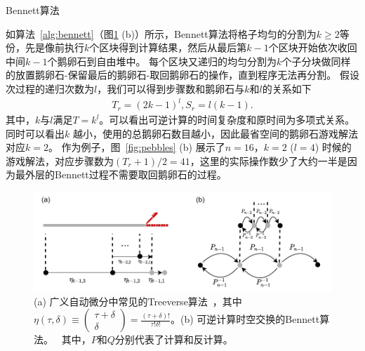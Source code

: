 \documentclass[A4,twoside,fontset=ubuntu,UTF8]{ctexart}
\begin{document}
\begin{algorithm}
    \SetAlgoLined
    \DontPrintSemicolon
    \caption{Bennett算法}\label{alg:bennett}
\end{algorithm}
如算法~\ref{alg:bennett}（图\ref{fig:tradeoff} (b)）所示，Bennett算法将格子均匀的分割为$k\geq 2$等份，先是像前执行$k$个区块得到计算结果，然后从最后第$k-1$个区块开始依次收回中间$k-1$个鹅卵石到自由堆中。
每个区块又递归的均匀分割为$k$个子分块做同样的放置鹅卵石-保留最后的鹅卵石-取回鹅卵石的操作，直到程序无法再分割。
假设次过程的递归次数为$l$，我们可以得到步骤数和鹅卵石与$k$和$l$的关系如下
\begin{align}\label{eq:rev}
    T_r = (2k-1)^l, S_r = l(k-1).
\end{align}
其中，$k$与$l$满足$T = k^l$。可以看出可逆计算的时间复杂度和原时间为多项式关系。
同时可以看出$k$ 越小，使用的总鹅卵石数目越小，因此最省空间的鹅卵石游戏解法对应$k=2$。
作为例子，图~\ref{fig:pebbles} (b) 展示了$n=16$，$k=2$ ($l=4$) 时候的游戏解法，对应步骤数为$(T_r+1)/2 = 41$，这里的实际操作数少了大约一半是因为最外层的Bennett过程不需要取回鹅卵石的过程。

\begin{figure}
    \centerline{\includegraphics[width=0.88\columnwidth,trim={0 0cm 0 0cm},clip]{tradeoff2.pdf}}
    \caption{(a) 广义自动微分中常见的Treeverse算法~\cite{Griewank1992}，其中$\eta(\tau, \delta) \equiv \left(\begin{matrix} \tau + \delta \\ \delta \end{matrix}\right)=\frac{(\tau+\delta)!}{\tau!\delta!}$。(b) 可逆计算时空交换的Bennett算法。~\cite{Bennett1973,Levine1990} 其中，$P$和$Q$分别代表了计算和反计算。}\label{fig:tradeoff}
\end{figure}
\end{document}
